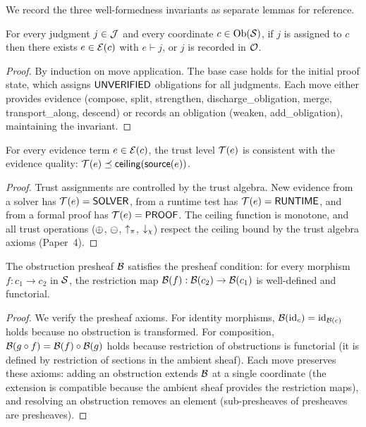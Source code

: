 \documentclass[11pt]{article}
\begin{document}
We record the three well-formedness invariants as separate lemmas
for reference.

\begin{lemma}\label{lem:wf1}
For every judgment $j \in \mathcal{J}$ and every coordinate $c \in \mathrm{Ob}(\mathcal{S})$,
if $j$ is assigned to $c$ then there exists $e \in \mathcal{E}(c)$ with
$e \vdash j$, or $j$ is recorded in $\mathcal{O}$.
\end{lemma}

\begin{proof}
By induction on move application.  The base case holds for
the initial proof state, which assigns $\mathsf{UNVERIFIED}$ obligations
for all judgments.  Each move either provides evidence
(compose, split, strengthen, discharge\_obligation, merge,
transport\_along, descend) or records an obligation
(weaken, add\_obligation), maintaining the invariant.
\end{proof}

\begin{lemma}\label{lem:wf2}
For every evidence term $e \in \mathcal{E}(c)$, the trust level
$\mathcal{T}(e)$ is consistent with the evidence quality:
$\mathcal{T}(e) \preceq \mathsf{ceiling}(\mathsf{source}(e))$.
\end{lemma}

\begin{proof}
Trust assignments are controlled by the trust algebra.
New evidence from a solver has $\mathcal{T}(e) = \mathsf{SOLVER}$,
from a runtime test has $\mathcal{T}(e) = \mathsf{RUNTIME}$, and
from a formal proof has $\mathcal{T}(e) = \mathsf{PROOF}$.  The
ceiling function is monotone, and all trust operations
($\oplus$, $\ominus$, $\uparrow_\pi$, $\downarrow_\chi$) respect
the ceiling bound by the trust algebra axioms (Paper~4).
\end{proof}

\begin{lemma}\label{lem:wf3}
The obstruction presheaf $\mathcal{B}$ satisfies the presheaf
condition: for every morphism $f: c_1 \to c_2$ in $\mathcal{S}$,
the restriction map $\mathcal{B}(f): \mathcal{B}(c_2) \to \mathcal{B}(c_1)$
is well-defined and functorial.
\end{lemma}

\begin{proof}
We verify the presheaf axioms.  For identity morphisms,
$\mathcal{B}(\mathrm{id}_c) = \mathrm{id}_{\mathcal{B}(c)}$ holds because
no obstruction is transformed.  For composition, $\mathcal{B}(g \circ f)
= \mathcal{B}(f) \circ \mathcal{B}(g)$ holds because restriction of
obstructions is functorial (it is defined by restriction of
sections in the ambient sheaf).  Each move preserves these
axioms: adding an obstruction extends $\mathcal{B}$ at a single
coordinate (the extension is compatible because the ambient
sheaf provides the restriction maps), and resolving an
obstruction removes an element (sub-presheaves of presheaves
are presheaves).
\end{proof}
\end{document}
